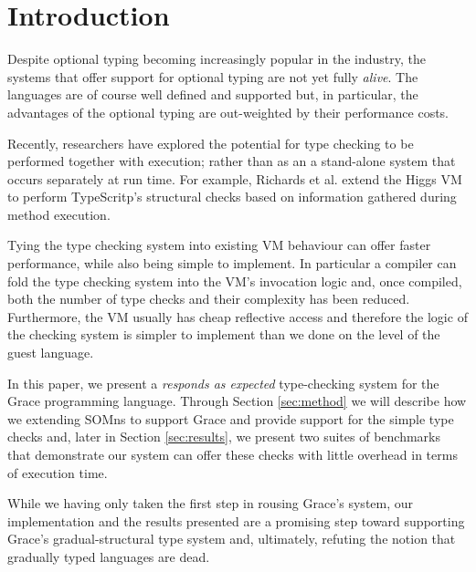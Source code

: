 \section{Introduction}
\label{sec:introduction}

Despite optional typing becoming increasingly popular in the industry, the systems that offer support for optional typing are not yet fully \emph{alive}. The languages are of course well defined and supported but, in particular, the advantages of the optional typing are out-weighted by their performance costs. 

Recently, researchers have explored the potential for type checking to be performed together with execution; rather than as an a stand-alone system that occurs separately at run time. For example, Richards et al. extend the Higgs VM to perform TypeScritp's structural checks based on information gathered during method execution. 

Tying the type checking system into existing VM behaviour can offer faster performance, while also being simple to implement. In particular a compiler can fold the type checking system into the VM's invocation logic and, once compiled, both the number of type checks and their complexity has been reduced. Furthermore, the VM usually has cheap reflective access and therefore the logic of the checking system is simpler to implement than we done on the level of the guest language.

In this paper, we present a \emph{responds as expected} type-checking system for the Grace programming language. Through Section \ref{sec:method} we will describe how we extending SOMns to support Grace and provide support for the simple type checks and, later in Section \ref{sec:results}, we present two suites of benchmarks that demonstrate our system can offer these checks with little overhead in terms of execution time.

While we having only taken the first step in rousing Grace's system, our implementation and the results presented are a promising step toward supporting Grace's gradual-structural type system and, ultimately, refuting the notion that gradually typed languages are dead.
